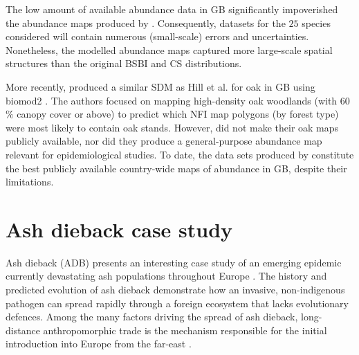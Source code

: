 The low amount of available abundance data in GB significantly impoverished the abundance maps produced by \cite{hill.data}. 
Consequently, datasets for the $25$ species considered will contain numerous (small-scale) errors and uncertainties. 
Nonetheless, the modelled abundance maps captured more large-scale spatial structures than the original BSBI and CS distributions.

More recently, \cite{ray2021multi} produced a similar SDM as Hill et al. for oak in GB using biomod2 \cite{thuiller2016package}.
The authors focused on mapping high-density oak woodlands (with 60$\%$ canopy cover or above) 
to predict which NFI map polygons (by forest type) were most likely to contain oak stands. 
However, \cite{ray2021multi} did not make their oak maps publicly available, nor did they produce a general-purpose
abundance map relevant for epidemiological studies. 
To date, the data sets produced by \cite{hill.data} constitute the best publicly available
country-wide maps of abundance in GB, despite their limitations.


\section{Ash dieback case study}


\label{ch2:ash-dieback}
Ash dieback (ADB) presents an interesting case study of an emerging epidemic currently devastating ash
populations throughout Europe \cite{enderle2019overview}. The history and predicted evolution of ash dieback
demonstrate how an invasive, non-indigenous pathogen can spread rapidly through a foreign ecosystem that 
lacks evolutionary defences. Among the many factors driving the spread of ash dieback, long-distance 
anthropomorphic trade is the mechanism responsible for the initial introduction into Europe from the
far-east \cite{zhao2013hymenoscyphus, queloz2011cryptic}.

